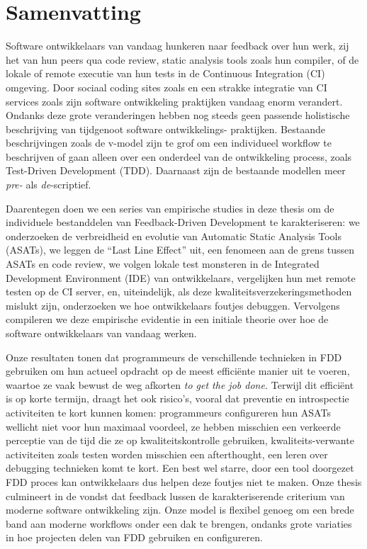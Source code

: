 \chapter*{Samenvatting}

{

Software ontwikkelaars van vandaag hunkeren naar feedback over hun werk, zij het van hun peers qua
code review, static analysis tools zoals hun compiler, of de lokale of remote executie van hun
tests in de Continuous Integration (CI) omgeving. Door sociaal coding sites zoals \github en een
strakke integratie van CI services zoals \travis zijn software ontwikkeling praktijken vandaag
enorm verandert. Ondanks deze grote veranderingen hebben nog steeds geen passende holistische
beschrijving van tijdgenoot software ontwikkelings- praktijken. Bestaande beschrijvingen zoals de
v-model zijn te grof om een individueel workflow te beschrijven of gaan alleen over een onderdeel
van de ontwikkeling process, zoals Test-Driven Development (TDD). Daarnaast zijn de bestaande
modellen meer \emph{pre-} als \emph{de}-scriptief.

Daarentegen doen we een series van empirische studies in deze thesis om de individuele
bestanddelen van Feedback-Driven Development te karakteriseren: we onderzoeken de verbreidheid en
evolutie van Automatic Static Analysis Tools (ASATs), we leggen de ``Last Line Effect'' uit, een
fenomeen aan de grens tussen ASATs en code review, we volgen lokale test monsteren in de Integrated
Development Environment (IDE) van ontwikkelaars, vergelijken hun met remote testen op de CI server,
en, uiteindelijk, als deze kwaliteitsverzekeringsmethoden mislukt zijn, onderzoeken we hoe
ontwikkelaars foutjes debuggen. Vervolgens compileren we deze empirische evidentie in een initiale
theorie over hoe de software ontwikkelaars van vandaag werken.

Onze resultaten tonen dat programmeurs de verschillende technieken in FDD gebruiken om hun actueel
opdracht op de meest effici{\"e}nte manier uit te voeren, waartoe ze vaak bewust de weg afkorten
\emph{to get the job done.} Terwijl dit effici{\"e}nt is op korte termijn, draagt het ook risico's,
vooral dat preventie en introspectie activiteiten te kort kunnen komen: programmeurs configureren
hun ASATs wellicht niet voor hun maximaal voordeel, ze hebben misschien een verkeerde perceptie van
de tijd die ze op kwaliteitskontrolle gebruiken, kwaliteits-verwante activiteiten zoals testen
worden misschien een afterthought, een leren over debugging technieken komt te kort. Een best wel
starre, door een tool doorgezet FDD proces kan ontwikkelaars dus helpen deze foutjes niet te
maken. Onze thesis culmineert in de vondst dat feedback lussen de karakteriserende criterium van
moderne software ontwikkeling zijn. Onze model is flexibel genoeg om een brede band aan moderne
workflows onder een dak te brengen, ondanks grote variaties in hoe projecten delen van FDD
gebruiken en configureren.}



